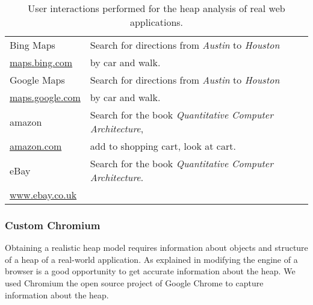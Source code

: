 \begin{table}
\begin{tabular}{l l}
		Bing Maps 				& Search for directions from \textit{Austin} to \textit{Houston}		\\ 
		\url{maps.bing.com} 	& by car and walk. 														\\ \midrule

		Google Maps				& Search for directions from \textit{Austin} to \textit{Houston}		\\ 
		\url{maps.google.com} 	& by car and walk. 														\\ \midrule

		amazon 					& Search for the book \textit{Quantitative Computer Architecture},		\\ 
		\url{amazon.com} 		& add to shopping cart, look at cart. 									\\ \midrule

		eBay 					& Search for the book \textit{Quantitative Computer Architecture}. 		\\ 
		\url{www.ebay.co.uk} 	& 																		\\ \bottomrule

	\end{tabular}
	\caption{User interactions performed for the heap analysis of real web applications.}
	\label{tab:real_world_apps}
\end{table}


\subsubsection{Custom Chromium} \label{sec:custom_chromium}
Obtaining a realistic \JS heap model requires information about objects and structure of a heap of a real-world \JS application. As explained in \cite{JSMeter2009} modifying the \JS engine of a browser is a good opportunity to get accurate information about the \JS heap. We used Chromium \cite{Chromium} the open source project of Google Chrome \cite{Chrome} to capture information about the \JS heap.

